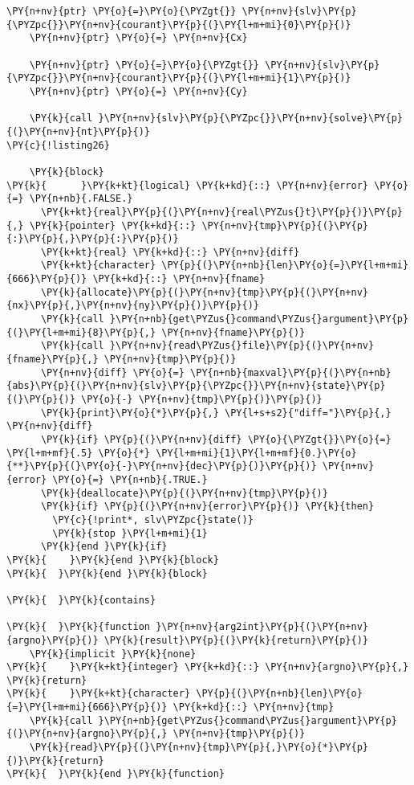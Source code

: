 \begin{Verbatim}[commandchars=\\\{\}]
    \PY{n+nv}{ptr} \PY{o}{=}\PY{o}{\PYZgt{}} \PY{n+nv}{slv}\PY{p}{\PYZpc{}}\PY{n+nv}{courant}\PY{p}{(}\PY{l+m+mi}{0}\PY{p}{)} 
    \PY{n+nv}{ptr} \PY{o}{=} \PY{n+nv}{Cx}

    \PY{n+nv}{ptr} \PY{o}{=}\PY{o}{\PYZgt{}} \PY{n+nv}{slv}\PY{p}{\PYZpc{}}\PY{n+nv}{courant}\PY{p}{(}\PY{l+m+mi}{1}\PY{p}{)} 
    \PY{n+nv}{ptr} \PY{o}{=} \PY{n+nv}{Cy}

    \PY{k}{call }\PY{n+nv}{slv}\PY{p}{\PYZpc{}}\PY{n+nv}{solve}\PY{p}{(}\PY{n+nv}{nt}\PY{p}{)}
\PY{c}{!listing26}

    \PY{k}{block}
\PY{k}{      }\PY{k+kt}{logical} \PY{k+kd}{::} \PY{n+nv}{error} \PY{o}{=} \PY{n+nb}{.FALSE.}
      \PY{k+kt}{real}\PY{p}{(}\PY{n+nv}{real\PYZus{}t}\PY{p}{)}\PY{p}{,} \PY{k}{pointer} \PY{k+kd}{::} \PY{n+nv}{tmp}\PY{p}{(}\PY{p}{:}\PY{p}{,}\PY{p}{:}\PY{p}{)}
      \PY{k+kt}{real} \PY{k+kd}{::} \PY{n+nv}{diff}
      \PY{k+kt}{character} \PY{p}{(}\PY{n+nb}{len}\PY{o}{=}\PY{l+m+mi}{666}\PY{p}{)} \PY{k+kd}{::} \PY{n+nv}{fname}
      \PY{k}{allocate}\PY{p}{(}\PY{n+nv}{tmp}\PY{p}{(}\PY{n+nv}{nx}\PY{p}{,}\PY{n+nv}{ny}\PY{p}{)}\PY{p}{)}
      \PY{k}{call }\PY{n+nb}{get\PYZus{}command\PYZus{}argument}\PY{p}{(}\PY{l+m+mi}{8}\PY{p}{,} \PY{n+nv}{fname}\PY{p}{)}
      \PY{k}{call }\PY{n+nv}{read\PYZus{}file}\PY{p}{(}\PY{n+nv}{fname}\PY{p}{,} \PY{n+nv}{tmp}\PY{p}{)}
      \PY{n+nv}{diff} \PY{o}{=} \PY{n+nb}{maxval}\PY{p}{(}\PY{n+nb}{abs}\PY{p}{(}\PY{n+nv}{slv}\PY{p}{\PYZpc{}}\PY{n+nv}{state}\PY{p}{(}\PY{p}{)} \PY{o}{-} \PY{n+nv}{tmp}\PY{p}{)}\PY{p}{)}
      \PY{k}{print}\PY{o}{*}\PY{p}{,} \PY{l+s+s2}{"diff="}\PY{p}{,} \PY{n+nv}{diff}
      \PY{k}{if} \PY{p}{(}\PY{n+nv}{diff} \PY{o}{\PYZgt{}}\PY{o}{=} \PY{l+m+mf}{.5} \PY{o}{*} \PY{l+m+mi}{1}\PY{l+m+mf}{0.}\PY{o}{**}\PY{p}{(}\PY{o}{-}\PY{n+nv}{dec}\PY{p}{)}\PY{p}{)} \PY{n+nv}{error} \PY{o}{=} \PY{n+nb}{.TRUE.}
      \PY{k}{deallocate}\PY{p}{(}\PY{n+nv}{tmp}\PY{p}{)}
      \PY{k}{if} \PY{p}{(}\PY{n+nv}{error}\PY{p}{)} \PY{k}{then}
        \PY{c}{!print*, slv\PYZpc{}state()}
        \PY{k}{stop }\PY{l+m+mi}{1}
      \PY{k}{end }\PY{k}{if}
\PY{k}{    }\PY{k}{end }\PY{k}{block}
\PY{k}{  }\PY{k}{end }\PY{k}{block}

\PY{k}{  }\PY{k}{contains}

\PY{k}{  }\PY{k}{function }\PY{n+nv}{arg2int}\PY{p}{(}\PY{n+nv}{argno}\PY{p}{)} \PY{k}{result}\PY{p}{(}\PY{k}{return}\PY{p}{)}
    \PY{k}{implicit }\PY{k}{none}
\PY{k}{    }\PY{k+kt}{integer} \PY{k+kd}{::} \PY{n+nv}{argno}\PY{p}{,} \PY{k}{return}
\PY{k}{    }\PY{k+kt}{character} \PY{p}{(}\PY{n+nb}{len}\PY{o}{=}\PY{l+m+mi}{666}\PY{p}{)} \PY{k+kd}{::} \PY{n+nv}{tmp}
    \PY{k}{call }\PY{n+nb}{get\PYZus{}command\PYZus{}argument}\PY{p}{(}\PY{n+nv}{argno}\PY{p}{,} \PY{n+nv}{tmp}\PY{p}{)}
    \PY{k}{read}\PY{p}{(}\PY{n+nv}{tmp}\PY{p}{,}\PY{o}{*}\PY{p}{)}\PY{k}{return}
\PY{k}{  }\PY{k}{end }\PY{k}{function}


\end{Verbatim}
